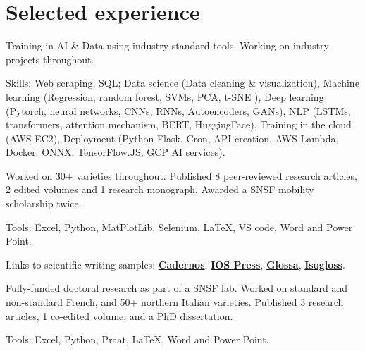 \documentclass[]{plushcv}
\begin{document}
\begin{minipage}[t]{0.70\textwidth} 



\section{Selected experience}

Training in AI \& Data using industry-standard tools. Working on industry projects throughout.
\sectionsep
\sectionsep
\begin{tightemize}
\item Skills: Web scraping, SQL; Data science (Data cleaning \& visualization), Machine learning (Regression, random forest, SVMs, PCA, t-SNE ), Deep learning (Pytorch, neural networks, CNNs, RNNs, Autoencoders, GANs), NLP (LSTMs, transformers, attention mechanism, BERT, HuggingFace), Training in the cloud (AWS EC2), Deployment (Python Flask, Cron, API creation, AWS Lambda, Docker, ONNX, TensorFlow.JS, GCP AI services).
\end{tightemize}
\sectionsep

Worked on 30+ varieties throughout. Published 8 peer-reviewed research articles, 2 edited volumes and 1 research monograph. Awarded a SNSF mobility scholarship twice.
\sectionsep
\begin{tightemize}
\item Tools: Excel, Python, MatPlotLib, Selenium, LaTeX, VS code, Word and Power Point.
\item Links to scientific writing samples: \href{https://periodicos.unb.br/index.php/cs/article/view/40559/33149}{\textbf{Cadernos}}, \href{https://ebooks.iospress.nl/doi/10.3233/SHTI220702}{\textbf{IOS Press}}, \href{https://doi.org/10.16995/glossa.5714}{\textbf{Glossa}}, \href{https://doi.org/10.5565/rev/isogloss.108}{\textbf{Isogloss}}.
\end{tightemize}
\sectionsep

Fully-funded doctoral research as part of a SNSF lab. Worked on standard and non-standard French, and 50+ northern Italian varieties. Published 3 research articles, 1 co-edited volume, and a PhD dissertation.
\begin{tightemize}
\item Tools: Excel, Python, Praat, LaTeX, Word and Power Point.
\end{tightemize}
\sectionsep


\end{minipage}
\end{document}
